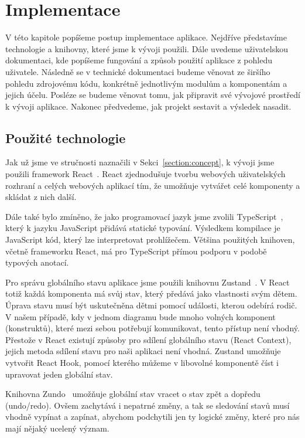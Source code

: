 \chapter{Implementace}\label{chapter:implementace}

V této kapitole popíšeme postup implementace aplikace.
Nejdříve představíme technologie a knihovny, které jsme k vývoji použili.
Dále uvedeme uživatelskou dokumentaci, kde popíšeme fungování a způsob použití aplikace z pohledu uživatele.
Následně se v technické dokumentaci budeme věnovat ze širšího pohledu zdrojovému kódu, konkrétně jednotlivým modulům a komponentám a jejich účelu.
Posléze se budeme věnovat tomu, jak připravit své vývojové prostředí k vývoji aplikace.
Nakonec předvedeme, jak projekt sestavit a výsledek nasadit.

\section{Použité technologie}

Jak už jsme ve stručnosti naznačili v Sekci~\ref{section:concept}, k vývoji jsme použili framework React~\cite{react_2023}.
React zjednodušuje tvorbu webových uživatelských rozhraní a celých webových aplikací tím, že umožňuje vytvářet celé komponenty a skládat z nich další.

Dále také bylo zmíněno, že jako programovací jazyk jsme zvolili TypeScript~\cite{microsoft_typescriptjavascript_}, který k jazyku JavaScript přidává statické typování.
Výsledkem kompilace je Java\-Script kód, který lze interpretovat prohlížečem.
Většina použitých knihoven, včetně frameworku React, má pro TypeScript přímou podporu v podobě typových anotací.

Pro správu globálního stavu aplikace jsme použili knihovnu Zustand~\cite{daishikato_zustand_2019}.
V React totiž každá komponenta má svůj stav, který předává jako vlastnosti svým dětem.
Úprava stavu musí být uskutečněna dětmi pomocí události, kterou odebírá rodič.
V našem případě, kdy v jednom diagramu bude mnoho volných komponent (konstruktů), které mezi sebou potřebují komunikovat, tento přístup není vhodný.
Přestože v React existují způsoby pro sdílení globálního stavu (React Context), jejich metoda sdílení stavu pro naši aplikaci není vhodná.
Zustand umožňuje vytvořit React Hook, pomocí kterého můžeme v libovolné komponentě číst i upravovat jeden globální stav.

Knihovna Zundo~\cite{kornoelje_zundo_2021} umožňuje globální stav vracet o stav zpět a dopředu (undo/redo).
Ovšem zachytává i nepatrné změny, a tak se sledování stavů musí vhodně vypínat a zapínat, abychom podchytili jen ty logické změny, které pro nás mají nějaký ucelený význam.

